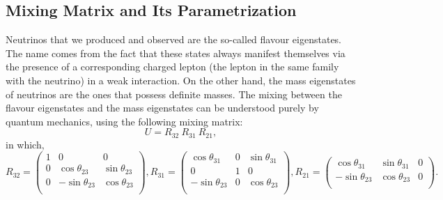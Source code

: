 

\subsection{Mixing Matrix and Its Parametrization}
Neutrinos that we produced and observed are the so-called flavour eigenstates. The name comes from the fact that these states always manifest themselves via the presence of a corresponding charged lepton (the lepton in the same family with the neutrino) in a weak interaction. On the other hand, the mass eigenstates of neutrinos are the ones that possess definite masses. The mixing between the flavour eigenstates and the mass eigenstates can be understood purely by quantum mechanics, using the following mixing matrix:
\begin{equation}
U = R_{32}~R_{31}~R_{21},
\end{equation}
in which,
\begin{equation}
R_{32} = 
\begin{pmatrix}
1 & 0 & 0 \\
0 & \cos\theta_{23} & \sin\theta_{23}  \\
0 & -\sin\theta_{23} & \cos\theta_{23}  \\
\end{pmatrix},
R_{31} = 
\begin{pmatrix}
\cos\theta_{31} & 0 & \sin\theta_{31} \\
0 & 1 & 0  \\
-\sin\theta_{23} & 0 & \cos\theta_{23}  \\
\end{pmatrix},
R_{21} = 
\begin{pmatrix}
\cos\theta_{31} & \sin\theta_{31} & 0 \\
-\sin\theta_{23} & \cos\theta_{23} & 0 \\
\end{pmatrix}.
\end{equation}